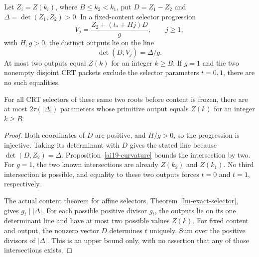 \begin{proposition}
\label{ai19-selectors}
Let \(Z_i=Z(k_i)\), where \(B\le k_2<k_1\), put
\(D=Z_1-Z_2\) and \(\Delta=\det(Z_1,Z_2)>0\). In a fixed-content
selector progression
\[
 V_j=\frac{Z_2+(t_*+Hj)D}{g},\qquad j\ge1,
\]
with \(H,g>0\), the distinct outputs lie on the line
\[
 \det(D,V_j)=\Delta/g.
\]
At most two outputs equal \(Z(k)\) for an integer \(k\ge B\).
If \(g=1\) and the two nonempty disjoint CRT packets exclude the
selector parameters \(t=0,1\), there are no such equalities.

For all CRT selectors of these same two roots before content is frozen,
there are at most \(2\tau(|\Delta|)\) parameters whose primitive output
equals \(Z(k)\) for an integer \(k\ge B\).
\end{proposition}
\begin{proof}
Both coordinates of \(D\) are positive, and \(H/g>0\), so the
progression is injective. Taking its determinant with \(D\) gives
the stated line because \(\det(D,Z_2)=\Delta\).
Proposition~\ref{ai19-curvature} bounds the intersection by two.
For \(g=1\), the two known intersections are already \(Z(k_2)\)
and \(Z(k_1)\). No third intersection is possible, and equality to
these two outputs forces \(t=0\) and \(t=1\), respectively.

The actual content theorem for affine selectors,
Theorem~\ref{lm-exact-selector}, gives
\(g_t\mid|\Delta|\). For each possible positive divisor \(g_t\),
the outputs lie on its one determinant line and have at most two
possible values \(Z(k)\). For fixed content and output, the
nonzero vector \(D\) determines \(t\) uniquely. Sum over the
positive divisors of \(|\Delta|\). This is an upper bound only,
with no assertion that any of those intersections exists.
\end{proof}

